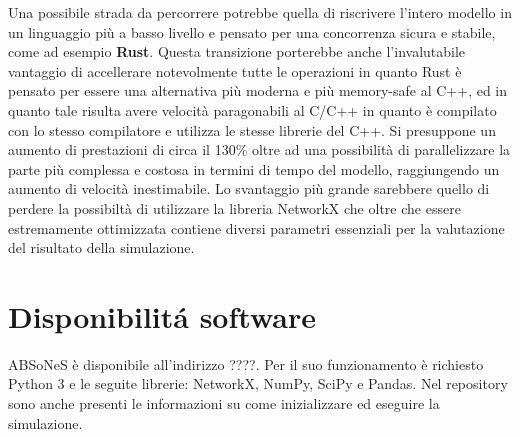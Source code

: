 \documentclass[a4paper,12pt]{article}
\begin{document}
\begin{description}
Una possibile strada da percorrere potrebbe quella di riscrivere l'intero modello in un linguaggio pi\`u a basso livello e pensato per una concorrenza sicura e stabile, come ad esempio \textbf{Rust}. Questa transizione porterebbe anche l'invalutabile vantaggio di accellerare notevolmente tutte le operazioni in quanto Rust \`e pensato per essere una alternativa pi\`u moderna e pi\`u memory-safe al C++, ed in quanto tale risulta avere velocit\`a paragonabili al C/C++ in quanto \`e compilato con lo stesso compilatore e utilizza le stesse librerie del C++. Si presuppone un aumento di prestazioni di circa il 130\% oltre ad una possibilit\`a di parallelizzare la parte pi\`u complessa e costosa in termini di tempo del modello, raggiungendo un aumento di velocit\`a inestimabile. 
Lo svantaggio pi\`u grande sarebbere quello di perdere la possibilt\`a di utilizzare la libreria NetworkX che oltre che essere estremamente ottimizzata contiene diversi parametri essenziali per la valutazione del risultato della simulazione.
\end{description}

\section{Disponibilit\'a software}
ABSoNeS \`e disponibile all'indirizzo ????. Per il suo funzionamento \`e richiesto Python 3 e le seguite librerie: NetworkX, NumPy, SciPy e Pandas.
Nel repository sono anche presenti le informazioni su come inizializzare ed eseguire la simulazione.
\end{document}
